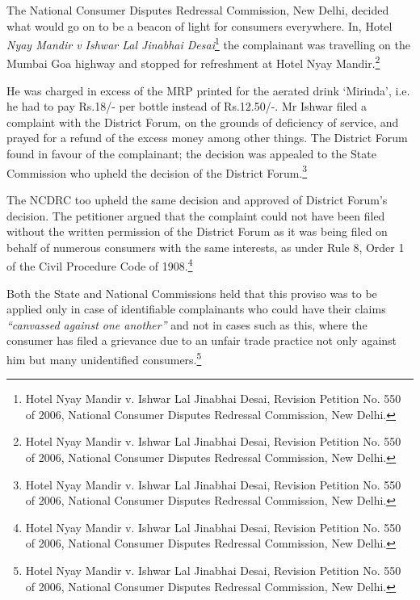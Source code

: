 \begin{multicols}{2}
\vspace{-.15cm}

\noi
The National Consumer Disputes Redressal Commission, New Delhi, decided what would go
on to be a beacon of light for consumers everywhere. In, Hotel \textit{Nyay Mandir v Ishwar Lal
Jinabhai Desai}\footnote{Hotel Nyay Mandir v. Ishwar Lal Jinabhai Desai, Revision Petition No. 550 of 2006, National Consumer Disputes Redressal Commission, New Delhi.} the complainant was travelling on the Mumbai Goa highway and stopped for refreshment at Hotel Nyay Mandir.\footnote{Hotel Nyay Mandir v. Ishwar Lal Jinabhai Desai, Revision Petition No. 550 of 2006, National Consumer Disputes Redressal Commission, New Delhi.}

\vspace{-.15cm}

\noi
He was charged in excess of the MRP printed for the aerated drink ‘Mirinda’, i.e. he had to pay
Rs.18/- per bottle instead of Rs.12.50/-. Mr Ishwar filed a complaint with the District Forum,
on the grounds of deficiency of service, and prayed for a refund of the excess money among
other things. The District Forum found in favour of the complainant; the decision was appealed
to the State Commission who upheld the decision of the District Forum.\footnote{Hotel Nyay Mandir v. Ishwar Lal Jinabhai Desai, Revision Petition No. 550 of 2006, National Consumer Disputes Redressal Commission, New Delhi.}

\vspace{-.15cm}

\noi
The NCDRC too upheld the same decision and approved of District Forum’s decision. The
petitioner argued that the complaint could not have been filed without the written permission
of the District Forum as it was being filed on behalf of numerous consumers with the same
interests, as under Rule 8, Order 1 of the Civil Procedure Code of 1908.\footnote{Hotel Nyay Mandir v. Ishwar Lal Jinabhai Desai, Revision Petition No. 550 of 2006, National Consumer Disputes Redressal Commission, New Delhi.}

\vspace{-.15cm}

\noi
Both the State and National Commissions held that this proviso was to be applied only in case
of identifiable complainants who could have their claims \textit{“canvassed against one another”} and
not in cases such as this, where the consumer has filed a grievance due to an unfair trade
practice not only against him but many unidentified consumers.\footnote{Hotel Nyay Mandir v. Ishwar Lal Jinabhai Desai, Revision Petition No. 550 of 2006, National Consumer Disputes Redressal Commission, New Delhi.}


\end{multicols}
